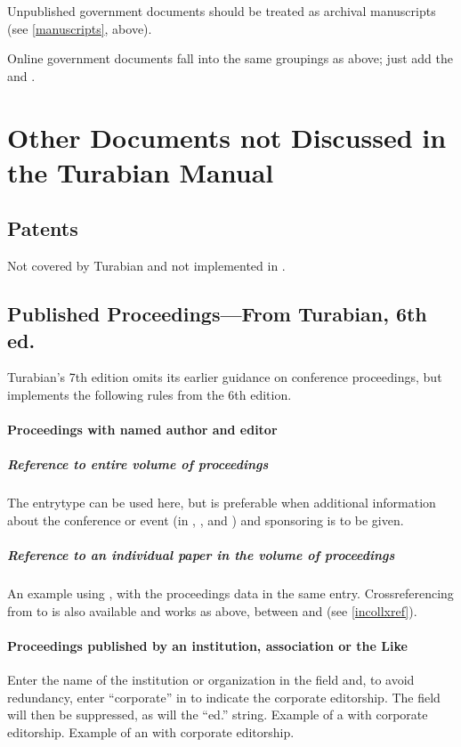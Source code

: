 \documentclass{ltxdockit}[2010/02/12]
\begin{document}
{Unpublished government documents should be treated as archival manuscripts (see \ref{manuscripts}, above).

Online government documents fall into the same groupings as above; just add the  and .




\section{Other Documents not Discussed in the Turabian Manual}

\subsection{Patents}
Not covered by Turabian and not implemented in .

\subsection{Published Proceedings---From Turabian, 6th ed.}
Turabian's 7th edition omits its earlier guidance on conference proceedings, but  implements the following rules from the 6th edition.
\paragraph{Proceedings with named author and editor}
\subparagraph{Reference to entire volume of proceedings}
The entrytype  can be used here,\autocites[][]{2488}  but  is preferable when additional information about the conference or event (in , , and ) and sponsoring  is to be given.\autocites[][]{143}


\subparagraph{Reference to an individual paper in the volume of proceedings}
An example using , with the proceedings data in the same entry.\autocites[][]{2489} Crossreferencing from  to  is also available and works as above, between  and  (see \ref{incollxref}).

\paragraph{Proceedings published by an institution, association or the Like}
Enter the name of the institution or organization in the  field and, to avoid redundancy, enter ``corporate'' in   to indicate the corporate editorship. The  field will then be suppressed, as will the ``ed.'' string. Example of a  with corporate editorship.\autocites{gdna:1922-as-proceedings-corp}
Example of an  with corporate editorship.\autocites[][]{sudhoff1922einleitung}

}
\end{document}
